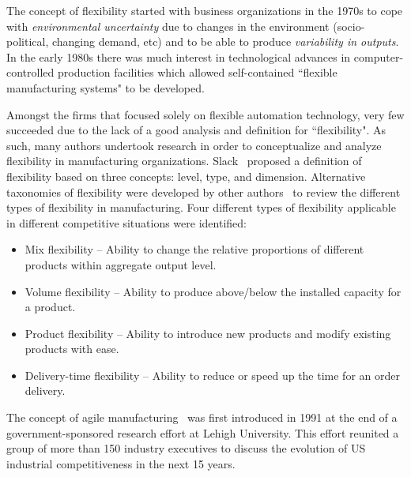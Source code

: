 \documentclass[final,12pt]{elsarticle}
\begin{document}
The concept of flexibility started with business organizations in the 1970s to cope with \textit{environmental uncertainty} due to changes in the environment (socio-political, changing demand, etc) and to be able to produce \textit{variability in outputs}. In the early 1980s there was much interest in technological advances in computer-controlled production facilities which allowed self-contained ``flexible manufacturing systems" to be developed.

Amongst the firms that focused solely on flexible automation technology, very few succeeded due to the lack of a good analysis and definition for ``flexibility". As such, many authors undertook research in order to conceptualize and analyze flexibility in manufacturing organizations. Slack~\cite{Slack.1988,Slack.1983} proposed a definition of flexibility based on three concepts: level, type, and dimension. Alternative taxonomies of flexibility were developed by other authors~\cite{Gervin.1987,Buzacott.1982,Mandelbaum.1978,Slack.1988,Slack.1983,Browne.1984,Jaikumar.HBR.1986} to review the different types of flexibility in manufacturing. Four different types of flexibility applicable in different competitive situations were identified:

\begin{itemize}
\item Mix flexibility -- Ability to change the relative proportions of different products within aggregate output level.
\item Volume flexibility -- Ability to produce above/below the installed capacity for a product.
\item Product flexibility -- Ability to introduce new products and modify existing products with ease.
\item Delivery-time flexibility -- Ability to reduce or speed up the time for an order delivery.
\end{itemize}

The concept of agile manufacturing~\cite{SHERIDAN.1993,Struebing.1995,NAGEL.1991} was first introduced in 1991 at the end of a government-sponsored research effort at Lehigh University. This effort reunited a group of more than 150 industry executives to discuss the evolution of US industrial competitiveness in the next 15 years.
\end{document}
